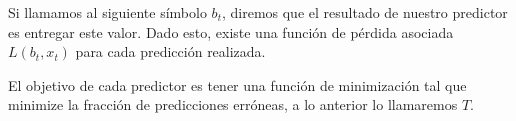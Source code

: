 

Si llamamos al siguiente símbolo $b_{t}$, diremos que el resultado de nuestro predictor es entregar este valor. Dado esto, existe una función de pérdida asociada $L( b_{t},x_{t} )$ para cada predicción realizada. 

El objetivo de cada predictor es tener una función de minimización tal que minimize la fracción de predicciones erróneas, a lo anterior lo llamaremos $T$.%










